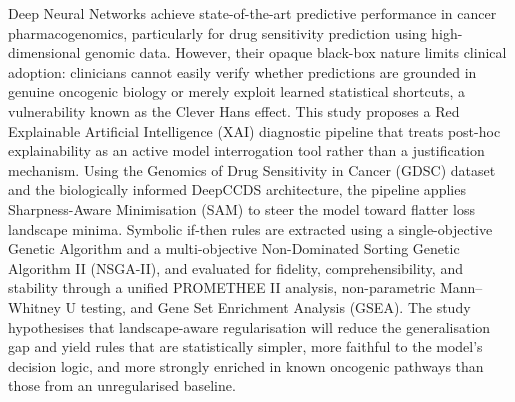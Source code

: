 Deep Neural Networks achieve state-of-the-art predictive performance in cancer pharmacogenomics,
particularly for drug sensitivity prediction using high-dimensional genomic data. However, their
opaque black-box nature limits clinical adoption: clinicians cannot easily verify whether predictions
are grounded in genuine oncogenic biology or merely exploit learned statistical shortcuts, a
vulnerability known as the Clever Hans effect. This study proposes a Red Explainable Artificial
Intelligence (XAI) diagnostic pipeline that treats post-hoc explainability as an active model
interrogation tool rather than a justification mechanism. Using the Genomics of Drug Sensitivity in
Cancer (GDSC) dataset and the biologically informed DeepCCDS architecture, the pipeline applies
Sharpness-Aware Minimisation (SAM) to steer the model toward flatter loss landscape minima. Symbolic
if-then rules are extracted using a single-objective Genetic Algorithm and a multi-objective
Non-Dominated Sorting Genetic Algorithm II (NSGA-II), and evaluated for fidelity, comprehensibility,
and stability through a unified PROMETHEE II analysis, non-parametric Mann--Whitney U testing, and Gene
Set Enrichment Analysis (GSEA). The study hypothesises that landscape-aware regularisation will reduce
the generalisation gap and yield rules that are statistically simpler, more faithful to the model's
decision logic, and more strongly enriched in known oncogenic pathways than those from an unregularised
baseline.
